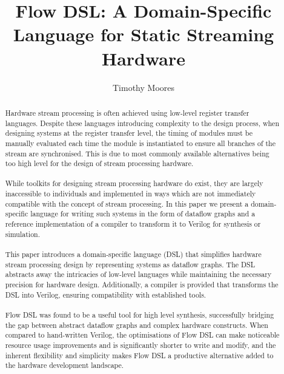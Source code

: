 \documentclass[a4paper, twoside, 10pt]{extreport}
\title{Flow DSL: A Domain-Specific Language for Static Streaming Hardware}
\author{Timothy Moores}
\begin{document}



\raggedbottom

\begin{abstract}
  \thispagestyle{plain}
Hardware stream processing is often achieved using low-level register transfer languages. Despite these languages introducing complexity to the design process, when designing systems at the register transfer level, the timing of modules must be manually evaluated each time the module is instantiated to ensure all branches of the stream are synchronised. This is due to most commonly available alternatives being too high level for the design of stream processing hardware.
\\ \\
While toolkits for designing stream processing hardware do exist, they are largely inaccessible to individuals and implemented in ways which are not immediately compatible with the concept of stream processing. In this paper we present a domain-specific language for writing such systems in the form of dataflow graphs and a reference implementation of a compiler to transform it to Verilog for synthesis or simulation.
\\ \\
This paper introduces a domain-specific language (DSL) that simplifies hardware stream processing design by representing systems as dataflow graphs. The DSL abstracts away the intricacies of low-level languages while maintaining the necessary precision for hardware design. Additionally, a compiler is provided that transforms the DSL into Verilog, ensuring compatibility with established tools.
\\ \\
Flow DSL was found to be a useful tool for high level synthesis, successfully bridging the gap between abstract dataflow graphs and complex hardware constructs. When compared to hand-written Verilog, the optimisations of Flow DSL can make noticeable resource usage improvements and is significantly shorter to write and modify, and the inherent flexibility and simplicity makes Flow DSL a productive alternative added to the hardware development landscape.


\end{abstract}
\newpage
\renewcommand{\abstractname}{Acknowledgements}
\end{document}
